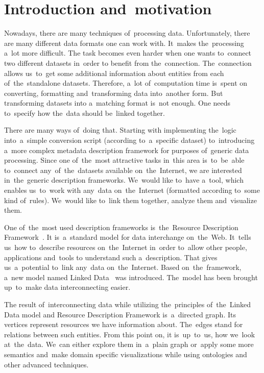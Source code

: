 \chapter*{Introduction and~motivation}
\label{ch:preface}
Nowadays, there are many techniques of~processing data. Unfortunately, there are many
different data formats one can work with. It~makes the~processing a~lot more difficult.
The task becomes even harder when one wants to~connect two different datasets in~order to
benefit from the~connection. The~connection allows us~to~get some additional information
about entities from each of~the~standalone datasets. Therefore, a~lot of~computation time is~spent
on converting, formatting and~transforming data into~another form. But transforming datasets
into a~matching format is~not enough. One needs to~specify how the~data should be~linked
together.

There are many ways of~doing that. Starting with implementing the~logic into~a~simple conversion
script (according to~a~specific dataset) to~introducing a~more complex metadata description
framework for purposes of~generic data processing. Since one of~the~most attractive
tasks in~this area is~to~be~able to~connect any~of~the~datasets available on~the~Internet,
we are interested in~the~generic description frameworks. We~would like to~have 
a~tool, 
which enables us~to~work with any~data on~the~Internet (formatted according to~some
kind of~rules). We~would like to~link them together, analyze them and~visualize 
them.

One of~the~most used description frameworks is~the~Resource Description Framework~\cite{rdf}.
It is~a~standard model for data interchange on~the~Web. It~tells us~how to~describe
resources on~the~Internet in~order to~allow other people, applications and~tools
to understand such a~description. That gives us~a~potential to~link any~data on~the~Internet.
Based on~the~framework, a~new model named Linked Data~\cite{ld} was introduced. The~model
has been brought up~to~make data interconnecting easier.

The result of~interconnecting data while utilizing the~principles of~the~Linked Data model
and Resource Description Framework is~a~directed graph. Its vertices represent resources we
have information about. The~edges stand for relations between such entities. From this point on,
it is~up~to~us, how we~look at~the~data. We~can either explore them in~a~plain graph or~apply
some more semantics and~make domain specific visualizations while using ontologies
and other advanced techniques.

